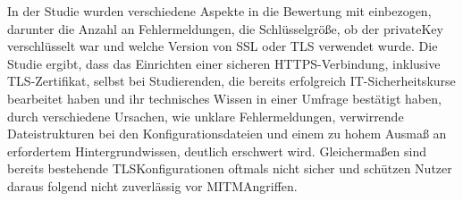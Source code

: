 
\par
In der Studie wurden verschiedene Aspekte in die Bewertung mit einbezogen, darunter die Anzahl an Fehlermeldungen, die Schlüsselgröße, ob der \gls{privateKey} verschlüsselt war und welche Version von \ac{SSL} oder \ac{TLS} verwendet wurde.
Die Studie ergibt, dass das Einrichten einer sicheren \ac{HTTPS}-Verbindung, inklusive \ac{TLS}-Zertifikat, selbst bei Studierenden, die bereits erfolgreich IT-Sicherheitskurse bearbeitet haben und ihr technisches Wissen in einer Umfrage bestätigt haben, durch verschiedene Ursachen, wie \zb unklare Fehlermeldungen, verwirrende Dateistrukturen bei den Konfigurationsdateien und einem zu hohem Ausmaß an erfordertem Hintergrundwissen, deutlich erschwert wird.\autocite[\vglf][]{usabilityHTTPS:2017} Gleichermaßen sind bereits bestehende \ac{TLS}\nonbreakdash Konfigurationen oftmals nicht sicher und schützen Nutzer daraus folgend nicht zuverlässig vor \ac{MITM}\nonbreakdash Angriffen\autocite[\vglf][]{usabilityHTTPS:2017}.